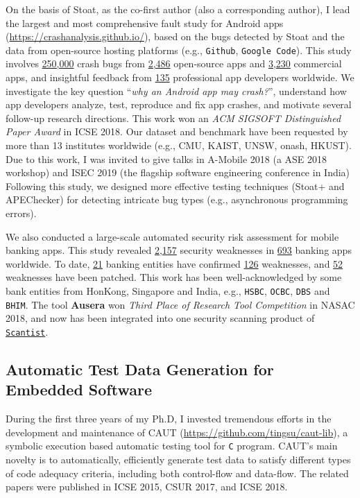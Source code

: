 \documentclass[a4paper]{article}
\begin{document}
On the basis of Stoat, as the co-first author (also a corresponding author), I lead the largest and most comprehensive fault study for Android apps (\url{https://crashanalysis.github.io/}), based on the bugs detected by Stoat and the data from open-source hosting platforms (e.g., \texttt{Github}, \texttt{Google Code}). This study involves \underline{250,000} crash bugs from \underline{2,486} open-source apps and \underline{3,230} commercial apps, and insightful feedback from \underline{135} professional app developers worldwide. We investigate the key question ``\emph{why an Android app may crash?}'', understand how app developers analyze, test, reproduce and fix app crashes, and motivate several follow-up research directions. This work won an \emph{ACM SIGSOFT Distinguished Paper Award} in ICSE 2018. Our dataset and benchmark have been requested by more than 13 institutes worldwide (e.g., CMU, KAIST, UNSW, onash, HKUST). Due to this work, I was invited to give talks in A-Mobile 2018 (a ASE 2018 workshop) and ISEC 2019 (the flagship software engineering conference in India)
Following this study, we designed more effective testing techniques (Stoat+ and APEChecker) for detecting intricate bug types (e.g., asynchronous programming errors). 

We also conducted a large-scale automated security risk assessment for mobile banking apps. This study revealed \underline{2,157} security weaknesses in \underline{693} banking apps worldwide. To date, \underline{21} banking entities have confirmed \underline{126} weaknesses, and \underline{52} weaknesses have been patched. This work has been well-acknowledged by some bank entities from HonKong, Singapore and India, e.g., \texttt{HSBC}, \texttt{OCBC}, \texttt{DBS} and \texttt{BHIM}. The tool \textbf{Ausera} won \emph{Third Place of Research Tool Competition} in NASAC 2018, and now has been integrated into one security scanning product of \href{https://scantist.com/}{\texttt{Scantist}}. 


\subsection{Automatic Test Data Generation for Embedded Software}
\label{unit_testing}

During the first three years of my Ph.D, I invested tremendous efforts in the development and maintenance of CAUT (\url{https://github.com/tingsu/caut-lib}), a symbolic execution based automatic testing tool for \texttt{C} program. CAUT's main novelty is to automatically, efficiently generate test data to satisfy different types of code adequacy criteria, including both control-flow and data-flow. The related papers were published in ICSE 2015, CSUR 2017, and ICSE 2018.
\end{document}
